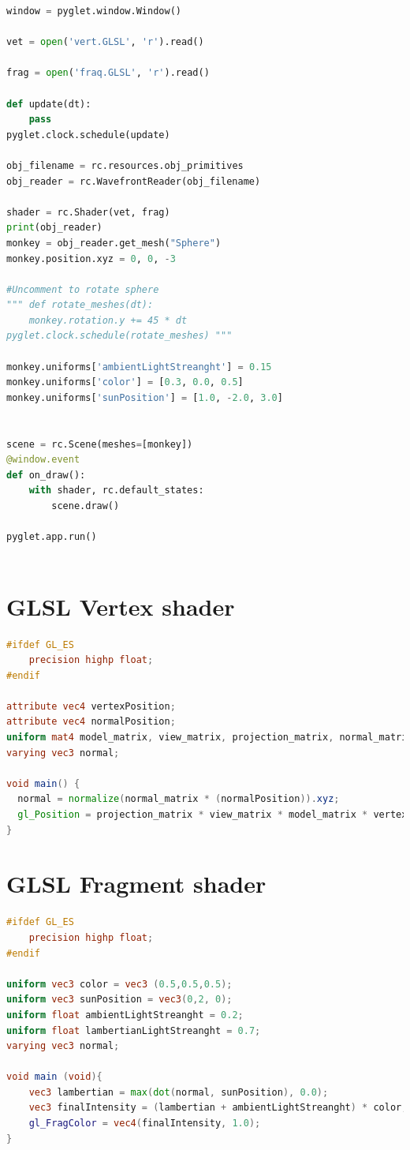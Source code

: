 \documentclass{article}
\begin{document}
\begin{appendices}
\begin{lstlisting}[language=python]
window = pyglet.window.Window()

vet = open('vert.GLSL', 'r').read()

frag = open('fraq.GLSL', 'r').read()

def update(dt):
    pass
pyglet.clock.schedule(update)

obj_filename = rc.resources.obj_primitives
obj_reader = rc.WavefrontReader(obj_filename)

shader = rc.Shader(vet, frag)
print(obj_reader)
monkey = obj_reader.get_mesh("Sphere")
monkey.position.xyz = 0, 0, -3

#Uncomment to rotate sphere
""" def rotate_meshes(dt):
    monkey.rotation.y += 45 * dt
pyglet.clock.schedule(rotate_meshes) """

monkey.uniforms['ambientLightStreanght'] = 0.15
monkey.uniforms['color'] = [0.3, 0.0, 0.5]
monkey.uniforms['sunPosition'] = [1.0, -2.0, 3.0]


scene = rc.Scene(meshes=[monkey])
@window.event
def on_draw():
    with shader, rc.default_states:
        scene.draw()

pyglet.app.run()
            
        \end{lstlisting}
        \section{GLSL Vertex shader}
        \label{appendix:vertex}
        \begin{lstlisting}[language=GLSL]
#ifdef GL_ES
    precision highp float;
#endif

attribute vec4 vertexPosition;
attribute vec4 normalPosition;
uniform mat4 model_matrix, view_matrix, projection_matrix, normal_matrix;
varying vec3 normal; 

void main() {
  normal = normalize(normal_matrix * (normalPosition)).xyz;
  gl_Position = projection_matrix * view_matrix * model_matrix * vertexPosition; 
}
        \end{lstlisting}
        \section{GLSL Fragment shader}
        \label{appendix:fragment}
        \begin{lstlisting}[language=GLSL]
#ifdef GL_ES
    precision highp float;
#endif

uniform vec3 color = vec3 (0.5,0.5,0.5);
uniform vec3 sunPosition = vec3(0,2, 0);
uniform float ambientLightStreanght = 0.2;
uniform float lambertianLightStreanght = 0.7;
varying vec3 normal;

void main (void){
    vec3 lambertian = max(dot(normal, sunPosition), 0.0);
    vec3 finalIntensity = (lambertian + ambientLightStreanght) * color;
    gl_FragColor = vec4(finalIntensity, 1.0);
}
        \end{lstlisting}

    \end{appendices}
\end{document}

